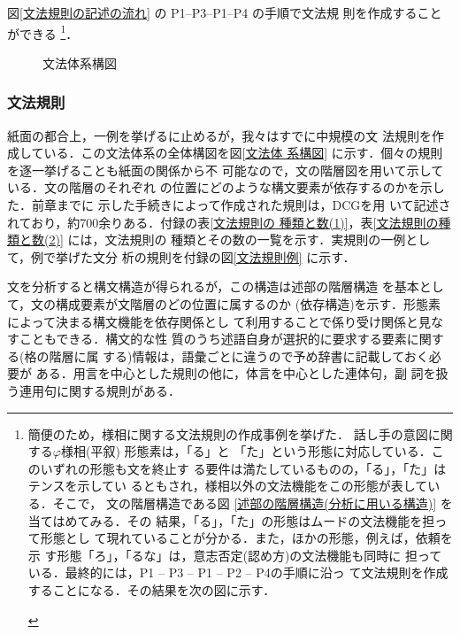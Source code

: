 図\ref{文法規則の記述の流れ} の P1--P3--P1--P4 の手順で文法規
則を作成することができる
\footnote{簡便のため，様相に関する文法規則の作成事例を挙げた．
話し手の意図に関する$\varphi$様相(平叙) 形態素は，「る」と
「た」という形態に対応している．このいずれの形態も文を終止す
る要件は満たしているものの，「る」，「た」はテンスを示してい
るともされ，様相以外の文法機能をこの形態が表している．そこで，
文の階層構造である図
\ref{述部の階層構造(分析に用いる構造)} を当てはめてみる．その
結果，「る」，「た」の形態はムードの文法機能を担って形態とし
て現れていることが分かる．また，ほかの形態，例えば，依頼を示
す形態「ろ」，「るな」は，意志否定(認め方)の文法機能も同時に
担っている．最終的には，P1 -- P3 -- P1 -- P2 -- P4の手順に沿っ
て文法規則を作成することになる．その結果を次の図に示す．

\begin{center}
\end{center}
}．

\begin{figure}[p]

\bigskip
\caption{文法体系構図}
\label{文法体系構図}
\end{figure}

\vspace*{-0.5mm}
\subsubsection{文法規則}
\vspace*{-0.2mm}

紙面の都合上，一例を挙げるに止めるが，我々はすでに中規模の文
法規則を作成している．この文法体系の全体構図を図\ref{文法体
系構図} に示す．個々の規則を逐一挙げることも紙面の関係から不
可能なので，文の階層図を用いて示している．文の階層のそれぞれ
の位置にどのような構文要素が依存するのかを示した．前章までに
示した手続きによって作成された規則は，DCG\cite{fernando}を用
いて記述されており，約700余りある．付録の表\ref {文法規則の
種類と数(1)}，表\ref{文法規則の種類と数(2)} には，文法規則の
種類とその数の一覧を示す．実規則の一例として，例で挙げた文分
析の規則を付録の図\ref{文法規則例} に示す．

文を分析すると構文構造が得られるが，この構造は述部の階層構造
を基本として，文の構成要素が文階層のどの位置に属するのか
(依存構造)を示す．形態素によって決まる構文機能を依存関係とし
て利用することで係り受け関係と見なすこともできる．構文的な性
質のうち述語自身が選択的に要求する要素に関する(格の階層に属
する)情報は，語彙ごとに違うので予め辞書に記載しておく必要が
ある．用言を中心とした規則の他に，体言を中心とした連体句，副
詞を扱う連用句に関する規則がある．


